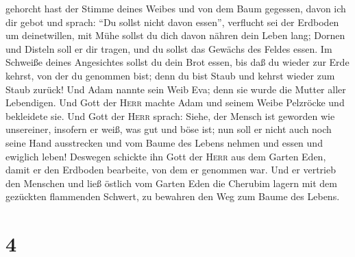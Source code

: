 gehorcht hast der Stimme deines Weibes und von dem Baum gegessen, davon
ich dir gebot und sprach: ``Du sollst nicht davon essen'', verflucht sei
der Erdboden um deinetwillen, mit Mühe sollst du dich davon nähren dein
Leben lang;  Dornen und Disteln soll er dir tragen, und
du sollst das Gewächs des Feldes essen.  Im Schweiße
deines Angesichtes sollst du dein Brot essen, bis daß du wieder zur Erde
kehrst, von der du genommen bist; denn du bist Staub und kehrst wieder
zum Staub zurück!  Und Adam nannte sein Weib Eva; denn
sie wurde die Mutter aller Lebendigen.  Und Gott der
\textsc{Herr} machte Adam und seinem Weibe Pelzröcke und bekleidete sie.
 Und Gott der \textsc{Herr} sprach: Siehe, der Mensch ist
geworden wie unsereiner, insofern er weiß, was gut und böse ist; nun
soll er nicht auch noch seine Hand ausstrecken und vom Baume des Lebens
nehmen und essen und ewiglich leben!  Deswegen schickte
ihn Gott der \textsc{Herr} aus dem Garten Eden, damit er den Erdboden
bearbeite, von dem er genommen war.  Und er vertrieb den
Menschen und ließ östlich vom Garten Eden die Cherubim lagern mit dem
gezückten flammenden Schwert, zu bewahren den Weg zum Baume des Lebens.

\hypertarget{section-3}{%
\section{4}\label{section-3}}


